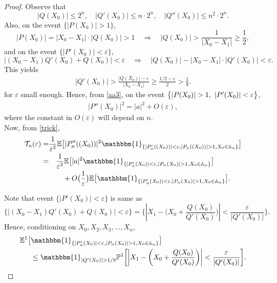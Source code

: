 \documentclass[9pt,a4paper,reqno]{amsart}
\theoremstyle{mine}
\theoremstyle{definition}
\theoremstyle{remark}
\renewcommand\epsilon{\varepsilon}
\newcommand{\mb}{\mathbb}
\begin{document}
\begin{proof}
Observe that  
\[
|Q(X_0)| \leq 2^n, \quad |Q'(X_0)| \leq n \cdot 2^n, \quad |Q''(X_0)| \leq n^2 \cdot 2^n.
\]
Also, on the event \( \{|P(X_0)| > 1\} \),
\[
|P(X_0)| = |X_0 - X_1| \cdot |Q(X_0)| > 1 \quad \Rightarrow \quad |Q(X_0)| > \frac{1}{|X_0 - X_1|} \geq \frac{1}{2},
\]
and on the event \( \{|P'(X_0)| < \epsilon \}\),
\[
\left| (X_0 - X_1) Q'(X_0) + Q(X_0) \right| < \epsilon \quad \Rightarrow \quad |Q(X_0)| - |X_0 - X_1| \cdot |Q'(X_0)| < \epsilon.
\]
This yields 
\begin{align}\label{lowerboundforQ'}
    |Q'(X_0)| > \frac{|Q(X_0)| - \epsilon}{|X_0 - X_1|} \geq \frac{1/2 - \epsilon}{2} >  \frac{1}{8}.
\end{align}
 for \( \epsilon \) small enough. Hence, from \eqref{aa3}, on the event $\big\{|P(X_0)| > 1 ,\hspace{.05in} |P'(X_0)|<\epsilon \big \}$,  
 \begin{align*}
     |P''(X_0)|^2= |a|^2 + O(\epsilon),
 \end{align*}
where the constant in $O(\epsilon)$ will depend on $n$. \\
Now, from \eqref{trick}, 
\begin{align}\nonumber 
    \mathcal{T}_n(\epsilon) =& \frac{1}{\epsilon^2} \mb{E}\bigl[|P_n''((X_0))|^2 \mathbbm{1}_{\{|P_n'((X_0))|<\epsilon, |P_n((X_0))| >1, X_0 \in \mb{A}_n\}}\bigr] \\
    =& \quad \frac{1}{\epsilon^2} \mb{E}\bigl[|a|^2 \mathbbm{1}_{\{|P_n'(X_0)|<\epsilon, |P_n(X_0)| >1, X_0 \in \mb{A}_n\}}\bigr] \label{main-1}\\& \qquad + O\bigl(\frac{1}{\epsilon}\bigr) \mb{E}\bigl[\mathbbm{1}_{\{|P_n'(X_0)|<\epsilon, |P_n(X_0)| >1, X_0 \in \mb{A}_n\}}\bigr]\label{error-1}.
\end{align} 

Note that event $\{|P'(X_0)| < \epsilon\}$ is same as 
\[\{\left| (X_0 - X_1) Q'(X_0) + Q(X_0) \right| < \epsilon\}  = \biggl\{\left| X_1 - \biggl(X_0 + \frac{Q(X_0)}{Q'(X_0)}\biggr) \right| < \frac{\epsilon}{|Q'(X_0)|}\biggr\}.\]
Hence, conditioning on $X_0, X_2, X_3,..., X_n$, 
\begin{align}
    \mb{E}^1\bigl[&\mathbbm{1}_{\{|P_n'(X_0)|<\epsilon, |P_n(X_0)| >1, X_0 \in \mb{A}_n\}}\bigr] \nonumber \\ &\leq \mathbbm{1}_{|Q'(X_0)| > 1/8} \mb{P}^1\biggl[\left |X_1 - \biggl(X_0 + \frac{Q(X_0)}{Q'(X_0)}\biggr) \right| < \frac{\epsilon}{|Q'(X_0)|}\biggr].\label{for-dct}
\end{align}
     

\end{proof}
\end{document}
